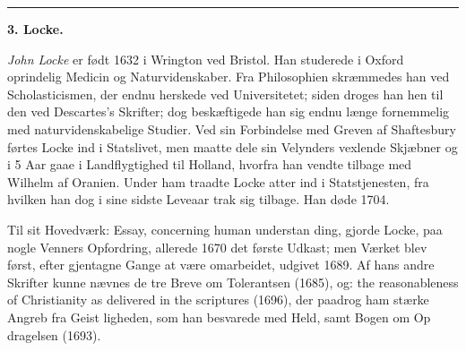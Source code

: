 \documentclass[12pt,a4paper]{book}
\newcommand{\divrule}{\begin{center}\rule{2cm}{0.4pt}\end{center}}
\begin{document}
\divrule

\begin{center}
  \textbf{3. Locke.}
\end{center}

\emph{John Locke} er født 1632 i Wrington ved Bristol. Han
studerede i Oxford oprindelig Medicin og Naturvidenskaber.
Fra Philosophien skræmmedes han ved Scholasticismen, der
endnu herskede ved Universitetet; siden droges han hen til
den ved Descartes's Skrifter; dog beskæftigede han sig endnu
længe fornemmelig med naturvidenskabelige Studier. Ved sin
Forbindelse med Greven af Shaftesbury førtes Locke ind i
Statslivet, men maatte dele sin Velynders vexlende Skjæbner
og i 5 Aar gaae i Landflygtighed til Holland, hvorfra han
vendte tilbage med Wilhelm af Oranien. Under ham traadte
Locke atter ind i Statstjenesten, fra hvilken han dog i sine
sidste Leveaar trak sig tilbage. Han døde 1704.

Til sit Hovedværk: Essay, concerning human understan\-%
ding, gjorde Locke, paa nogle Venners Opfordring, allerede
1670 det første Udkast; men Værket blev først, efter gjentagne
Gange at være omarbeidet, udgivet 1689. Af hans andre
Skrifter kunne nævnes de tre Breve om Tolerantsen (1685),
og: the reasonableness of Christianity as delivered in the
scriptures (1696), der paadrog ham stærke Angreb fra Geist\-%
ligheden, som han besvarede med Held, samt Bogen om Op\-%
dragelsen (1693).
\end{document}
